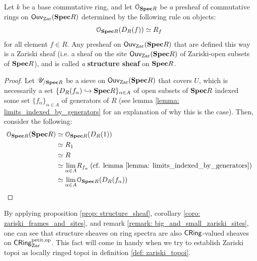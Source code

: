                 \begin{proposition} \label{prop: structure_sheaf} 
                    Let $k$ be a base commutative ring, and let $\mathcal{O}_{\mathbf{Spec} R}$ be \textit{a} presheaf of commutative rings on $\mathsf{Ouv}_{\mathrm{Zar}}(\mathbf{Spec} R)$ determined by the following rule on objects:
                        $$\mathcal{O}_{\mathbf{Spec} R}(D_R(f)) \simeq R_f$$
                    for all element $f \in R$. Any presheaf on $\mathsf{Ouv}_{\mathrm{Zar}}(\mathbf{Spec} R)$ that are defined this way is a Zariski sheaf (i.e. a sheaf on the site $\mathsf{Ouv}_{\mathrm{Zar}}(\mathbf{Spec} R)$ of Zariski-open subsets of $\mathbf{Spec} R$), and is called \textit{a} \textbf{structure sheaf} on $\mathbf{Spec} R$.
                \end{proposition}
                    \begin{proof}
                        Let $\mathscr{U}_{/\mathbf{Spec} R}$ be a sieve on $\mathsf{Ouv}_{\mathrm{Zar}}(\mathbf{Spec} R)$ that covers $U$, which is necessarily a set $\{D_R(f_{\alpha}) \hookrightarrow \mathbf{Spec} R\}_{\alpha \in A}$ of open subsets of $\mathbf{Spec} R$ indexed some set $\{f_{\alpha}\}_{\alpha \in A}$ of generators of $R$ (see lemma \ref{lemma: limits_indexed_by_generators} for an explanation of why this is the case). Then, consider the following:
                            $$
                                \begin{aligned}
                                    \mathcal{O}_{\mathbf{Spec} R}(\mathbf{Spec} R) & \simeq \mathcal{O}_{\mathbf{Spec} R}(D_R(1))
                                    \\
                                    & \simeq R_1
                                    \\
                                    & \simeq R
                                    \\
                                    & \simeq \underset{\alpha \in A}{\operatorname{lim}} R_{f_{\alpha}} \: \text{(cf. lemma \ref{lemma: limits_indexed_by_generators})}
                                    \\
                                    & \simeq \underset{\alpha \in A}{\operatorname{lim}} \mathcal{O}_{\mathbf{Spec} R}(D_R(f_{\alpha}))
                                \end{aligned}
                            $$
                    \end{proof}
                \begin{corollary}
                    By applying proposition \ref{prop: structure_sheaf}, corollary \ref{coro: zariski_frames_and_sites}, and remark \ref{remark: big_and_small_zariski_sites}, one can see that structure sheaves on ring spectra are also $\mathsf{CRing}$-valued sheaves on $\mathsf{CRing}^{\mathrm{petit}, \mathrm{op}}_{\mathrm{Zar}}$. This fact will come in handy when we try to establish Zariski topoi as locally ringed topoi in definition \ref{def: zariski_topoi}.
                \end{corollary}
